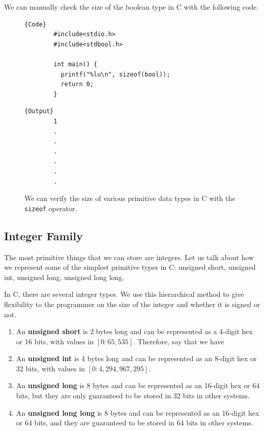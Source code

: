 \documentclass{article}
\begin{document}
    We can manually check the size of the boolean type in C with the following code. 

    \begin{figure}[H]
      \centering 
      \noindent\begin{minipage}{.5\textwidth}
      \begin{lstlisting}[firstnumber=1]{Code}
        #include<stdio.h>
        #include<stdbool.h>

        int main() {
          printf("%lu\n", sizeof(bool)); 
          return 0; 
        }
      \end{lstlisting}
      \end{minipage}
      \hfill
      \begin{minipage}{.49\textwidth}
      \begin{lstlisting}[]{Output}
        1
        .
        .
        .
        .
        .
        .
      \end{lstlisting}
      \end{minipage}
      \caption{We can verify the size of various primitive data types in C with the \texttt{sizeof} operator.} 
      \label{fig:boolean_size}
    \end{figure}

  \subsection{Integer Family}

    The most primitive things that we can store are integers. Let us talk about how we represent some of the simplest primitive types in C: unsigned short, unsigned int, unsigned long, unsigned long long.

    \begin{definition}
      In C, there are several integer types. We use this hierarchical method to give flexibility to the programmer on the size of the integer and whether it is signed or not. 
      \begin{enumerate} 
        \item An \textbf{unsigned short} is 2 bytes long and can be represented as a 4-digit hex or 16 bits, with values in $[0:65,535]$. Therefore, say that we have 
        \item An \textbf{unsigned int} is 4 bytes long and can be represented as an 8-digit hex or 32 bits, with values in $[0:4,294,967,295]$. 
        \item An \textbf{unsigned long} is 8 bytes and can be represented as an 16-digit hex or 64 bits, but they are only guaranteed to be stored in 32 bits in other systems. 
        \item An \textbf{unsigned long long} is 8 bytes and can be represented as an 16-digit hex or 64 bits, and they are guaranteed to be stored in 64 bits in other systems. 
      \end{enumerate} 
    \end{definition}
\end{document}
